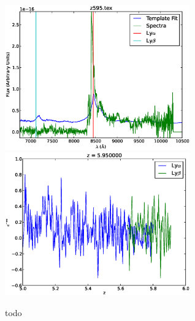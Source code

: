 \documentclass[11pt]{article}
\begin{document}
\begin{figure}[h]
  \includegraphics[width=8cm]{z595.eps}
  \includegraphics[width=8cm]{z595_Transmission.eps}
  \caption{todo}
  \label{fig:todo}
\end{figure}
\end{document}
